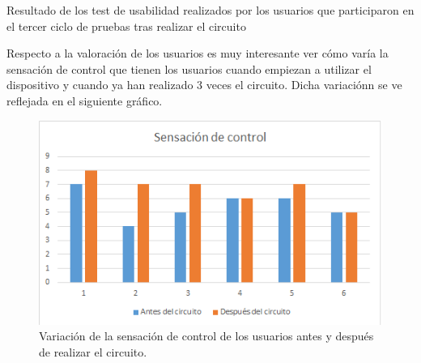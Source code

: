 \documentclass[twoside, 11pt]{epstfg}
\begin{document}
\begin{itemize}
\begin{center}
\begin{table}[h!]
		\caption{Resultado de los test de usabilidad realizados por los usuarios que participaron en el tercer ciclo de pruebas tras realizar el circuito}
	\end{table}
\end{center}

\newpage
Respecto a la valoración de los usuarios es muy interesante ver cómo varía la sensación de control que tienen los usuarios cuando empiezan a utilizar el dispositivo y cuando ya han realizado 3 veces el circuito. Dicha variaciónn se ve reflejada en el siguiente gráfico.

\begin{figure}[H]
	\centerline{
		\mbox{\includegraphics[width=.85\textwidth]{images/SensacionControl.png}}
	}
	\caption{Variación de la sensación de control de los usuarios antes y después de realizar el circuito.}
\end{figure}



\end{itemize}
%
%
%
%
\end{document}
